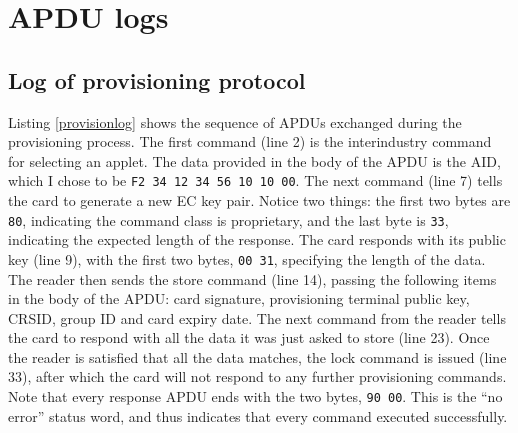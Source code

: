 \documentclass[12pt,a4paper,twoside,openright]{report}
\begin{document}
\section{APDU logs}

\subsection{Log of provisioning protocol}

Listing \autoref{provisionlog} shows the sequence of APDUs exchanged during the provisioning process. The first command (line 2) is the interindustry command for selecting an applet. The data provided in the body of the APDU is the AID, which I chose to be \texttt{F2 34 12 34 56 10 10 00}. The next command (line 7) tells the card to generate a new EC key pair. Notice two things: the first two bytes are \texttt{80}, indicating the command class is proprietary, and the last byte is \texttt{33}, indicating the expected length of the response. The card responds with its public key (line 9), with the first two bytes, \texttt{00 31}, specifying the length of the data. The reader then sends the store command (line 14), passing the following items in the body of the APDU: card signature, provisioning terminal public key, CRSID, group ID and card expiry date. The next command from the reader tells the card to respond with all the data it was just asked to store (line 23). Once the reader is satisfied that all the data matches, the lock command is issued (line 33), after which the card will not respond to any further provisioning commands. Note that every response APDU ends with the two bytes, \texttt{90 00}. This is the ``no error'' status word, and thus indicates that every command executed successfully.
\end{document}
